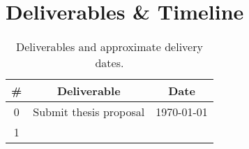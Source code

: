 \documentclass{article}
\begin{document}
    \section{Deliverables \& Timeline}
        \begin{table}[h!]
            \centering
            \begin{tabular}{|c|c|c|}
                \hline
                \# & Deliverable & Date\\
                \hline
                0 & Submit thesis proposal & \today\\
                1 & & \\
                \hline
            \end{tabular}
            \label{table:timeline}
            \caption{Deliverables and approximate delivery dates.}
        \end{table}

    \newpage
    
    
\end{document}

